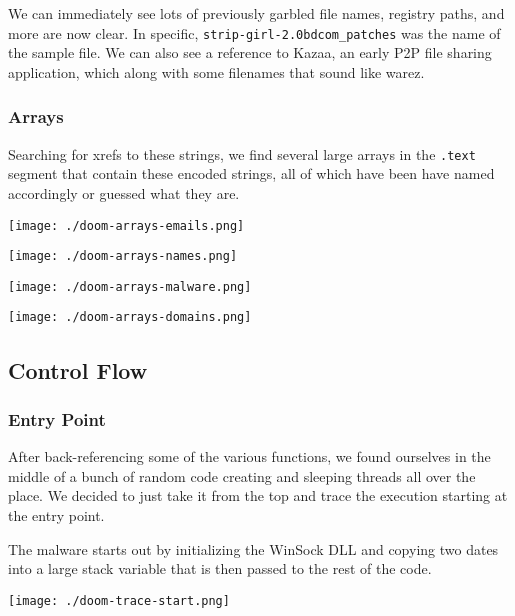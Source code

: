 \documentclass[11pt]{article}
\begin{document}
We can immediately see lots of previously garbled file names, registry
paths, and more are now clear. In specific,
\texttt{strip-girl-2.0bdcom\_patches} was the name of the sample file. We can
also see a reference to Kazaa, an early P2P file sharing application,
which along with some filenames that sound like warez.
\subsubsection{Arrays}
\label{sec:org0f793aa}
Searching for xrefs to these strings, we find several large arrays in
the \texttt{.text} segment that contain these encoded strings, all of which
have been have named accordingly or guessed what they are.

\begin{center}
\texttt{[image: ./doom-arrays-emails.png]}
\end{center}

\begin{center}
\texttt{[image: ./doom-arrays-names.png]}
\end{center}

\begin{center}
\texttt{[image: ./doom-arrays-malware.png]}
\end{center}

\begin{center}
\texttt{[image: ./doom-arrays-domains.png]}
\end{center}
\subsection{Control Flow}
\label{sec:org37a5e6c}
\subsubsection{Entry Point}
\label{sec:org1709483}
After back-referencing some of the various functions, we found
ourselves in the middle of a bunch of random code creating and
sleeping threads all over the place. We decided to just take it from
the top and trace the execution starting at the entry point.

The malware starts out by initializing the WinSock DLL and copying two
dates into a large stack variable that is then passed to the rest of
the code.

\begin{center}
\texttt{[image: ./doom-trace-start.png]}
\end{center}
\end{document}
